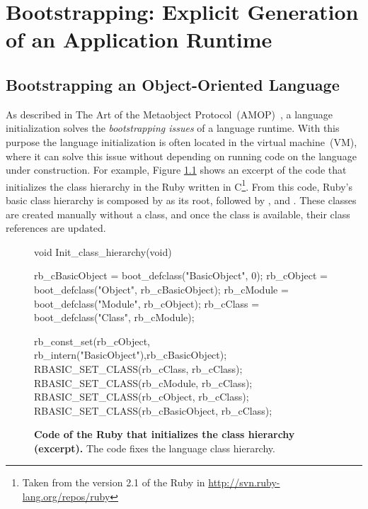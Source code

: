 
\part{Bootstrapping: Explicit Generation of an Application Runtime}
\chapter{Bootstrapping an Object-Oriented Language}
\introduction

As described in The Art of the Metaobject Protocol~(AMOP)~\cite{Kicz91a}, a language initialization solves the \emph{bootstrapping issues} of a language runtime. With this purpose the language initialization is often located in the virtual machine~(VM), where it can solve this issue without depending on running code on the language under construction. For example, Figure \ref{code:ruby_hierarchy} shows an excerpt of the code that initializes the class hierarchy in the Ruby \VM written in C\footnote{Taken from the version 2.1 of the Ruby \VM in \url{http://svn.ruby-lang.org/repos/ruby}}. From this code, Ruby's basic class hierarchy is composed by  as its root, followed by ,  and . These classes are created manually without a class, and once the class  is available, their class references are updated.

\begin{figure}[ht!]
\begin{code}
void Init_class_hierarchy(void) {
    rb_cBasicObject = boot_defclass("BasicObject", 0);
    rb_cObject = boot_defclass("Object", rb_cBasicObject);
    rb_cModule = boot_defclass("Module", rb_cObject);
    rb_cClass =  boot_defclass("Class",  rb_cModule);

    rb_const_set(rb_cObject, rb_intern("BasicObject"),rb_cBasicObject);
    RBASIC_SET_CLASS(rb_cClass, rb_cClass);
    RBASIC_SET_CLASS(rb_cModule, rb_cClass);
    RBASIC_SET_CLASS(rb_cObject, rb_cClass);
    RBASIC_SET_CLASS(rb_cBasicObject, rb_cClass);
}
\end{code}
\caption{\textbf{Code of the Ruby \VM that initializes the class hierarchy (excerpt).} The \VM code fixes the language class hierarchy.\label{code:ruby_hierarchy}}
\end{figure}


